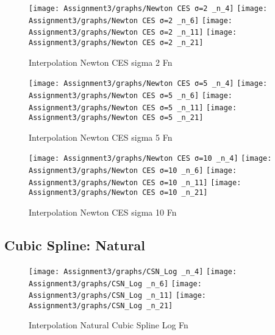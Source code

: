 \documentclass[]{article}
\begin{document}
\begin{figure}

{\centering \texttt{[image: Assignment3/graphs/Newton CES σ=2 \_n\_4]} \texttt{[image: Assignment3/graphs/Newton CES σ=2 \_n\_6]} \texttt{[image: Assignment3/graphs/Newton CES σ=2 \_n\_11]} \texttt{[image: Assignment3/graphs/Newton CES σ=2 \_n\_21]} 

}

\caption{Interpolation Newton CES sigma 2 Fn}\label{fig:unnamed-chunk-9}
\end{figure}

\begin{figure}

{\centering \texttt{[image: Assignment3/graphs/Newton CES σ=5 \_n\_4]} \texttt{[image: Assignment3/graphs/Newton CES σ=5 \_n\_6]} \texttt{[image: Assignment3/graphs/Newton CES σ=5 \_n\_11]} \texttt{[image: Assignment3/graphs/Newton CES σ=5 \_n\_21]} 

}

\caption{Interpolation Newton CES sigma 5 Fn}\label{fig:unnamed-chunk-10}
\end{figure}

\begin{figure}

{\centering \texttt{[image: Assignment3/graphs/Newton CES σ=10 \_n\_4]} \texttt{[image: Assignment3/graphs/Newton CES σ=10 \_n\_6]} \texttt{[image: Assignment3/graphs/Newton CES σ=10 \_n\_11]} \texttt{[image: Assignment3/graphs/Newton CES σ=10 \_n\_21]} 

}

\caption{Interpolation Newton CES sigma 10 Fn}\label{fig:unnamed-chunk-11}
\end{figure}

\hypertarget{cubic-spline-natural}{%
\subsection{Cubic Spline: Natural}\label{cubic-spline-natural}}

\begin{figure}

{\centering \texttt{[image: Assignment3/graphs/CSN\_Log \_n\_4]} \texttt{[image: Assignment3/graphs/CSN\_Log \_n\_6]} \texttt{[image: Assignment3/graphs/CSN\_Log \_n\_11]} \texttt{[image: Assignment3/graphs/CSN\_Log \_n\_21]} 

}

\caption{Interpolation Natural Cubic Spline Log Fn}\label{fig:unnamed-chunk-12}
\end{figure}
\end{document}
